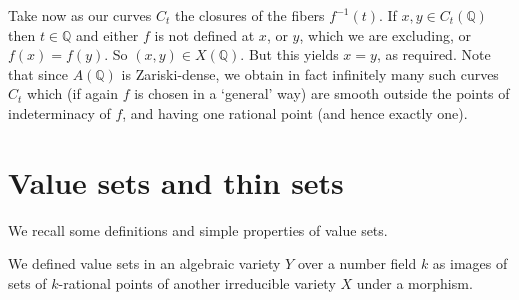 \documentclass[leqno,12pt]{article} %
\def\Q{{{\mathbb Q}}}
\theoremstyle{plain} %
\theoremstyle{definition} %
\begin{document}


Take now as our curves $C_t$ the closures of the fibers $f^{-1}(t)$. If $x,y\in C_t(\Q)$ then $t\in\Q$ and either $f$ is not defined at $x$, or $y$, which we are excluding, or $f(x)=f(y)$. So  $(x,y)\in X(\Q)$. But this yields $x=y$, as required. Note that since $A(\Q)$ is Zariski-dense, we obtain in fact infinitely many such curves $C_t$ which (if again $f$ is chosen in a `general' way) are smooth outside the points of indeterminacy of $f$, and having one rational point (and hence exactly one). 

\smallskip


 

\section{Value  sets and thin sets} 

We recall some definitions and simple properties of value sets.

We defined value sets in an algebraic variety $Y$ over a number field $k$ as images of sets of $k$-rational points of another irreducible variety   $X$ under a morphism.
\end{document}
